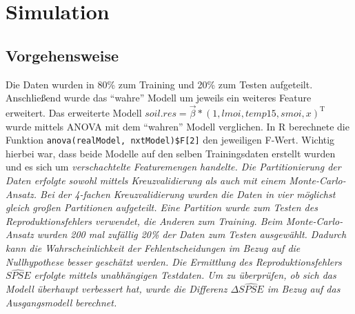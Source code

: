 \section{Simulation}
\subsection{Vorgehensweise}
Die Daten wurden in 80\% zum Training und 20\% zum Testen aufgeteilt.
Anschließend wurde das "`wahre"' Modell um jeweils ein weiteres Feature erweitert.
Das erweiterte Modell $soil.res = \vec{\beta} * (1,lmoi,temp15,smoi,x)^\text{T}$ wurde mittels ANOVA mit dem "`wahren"' Modell verglichen.
In R berechnete die Funktion \lstinline|anova(realModel, nxtModel)$F[2]| den jeweiligen F-Wert.
Wichtig hierbei war, dass beide Modelle auf den selben Trainingsdaten erstellt wurden und es sich um \it{verschachtelte} Featuremengen handelte.
Die Partitionierung der Daten erfolgte sowohl mittels Kreuzvalidierung als auch mit einem Monte-Carlo-Ansatz.
Bei der 4-fachen Kreuzvalidierung wurden die Daten in vier möglichst gleich großen Partitionen aufgeteilt.
Eine Partition wurde zum Testen des Reproduktionsfehlers verwendet, die Anderen zum Training.
Beim Monte-Carlo-Ansatz wurden 200 mal zufällig 20\% der Daten zum Testen ausgewählt.
Dadurch kann die Wahrscheinlichkeit der Fehlentscheidungen im Bezug auf die Nullhypothese besser geschätzt werden.
Die Ermittlung des Reproduktionsfehlers $\widehat{SPSE}$ erfolgte mittels unabhängigen Testdaten.
Um zu überprüfen, ob sich das Modell überhaupt verbessert hat, wurde die Differenz $\Delta \widehat{SPSE}$ im Bezug auf das Ausgangsmodell berechnet.

